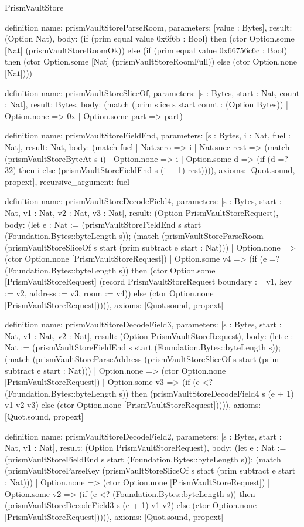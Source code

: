 \begin{lexlean}{PrismVaultStore}
\begin{semanticmodule}
definition{
  name: prismVaultStoreParseRoom,
  parameters: [value : Bytes],
  result: (Option Nat),
  body: (if (prim equal value 0x6f6b : Bool) then (ctor Option.some [Nat] (prismVaultStoreRoomOk)) else (if (prim equal value 0x66756c6c : Bool) then (ctor Option.some [Nat] (prismVaultStoreRoomFull)) else (ctor Option.none [Nat])))
}

definition{
  name: prismVaultStoreSliceOf,
  parameters: [s : Bytes, start : Nat, count : Nat],
  result: Bytes,
  body: (match (prim slice s start count : (Option Bytes))
    | Option.none => 0x
    | Option.some part => part)
}

definition{
  name: prismVaultStoreFieldEnd,
  parameters: [s : Bytes, i : Nat, fuel : Nat],
  result: Nat,
  body: (match fuel
    | Nat.zero => i
    | Nat.succ rest => (match (prismVaultStoreByteAt s i)
      | Option.none => i
      | Option.some d => (if (d =? 32) then i else (prismVaultStoreFieldEnd s (i + 1) rest)))),
  axioms: [Quot.sound, propext],
  recursive_argument: fuel
}

definition{
  name: prismVaultStoreDecodeField4,
  parameters: [s : Bytes, start : Nat, v1 : Nat, v2 : Nat, v3 : Nat],
  result: (Option PrismVaultStoreRequest),
  body: (let e : Nat := (prismVaultStoreFieldEnd s start (Foundation.Bytes::byteLength s)); (match (prismVaultStoreParseRoom (prismVaultStoreSliceOf s start (prim subtract e start : Nat)))
    | Option.none => (ctor Option.none [PrismVaultStoreRequest])
    | Option.some v4 => (if (e =? (Foundation.Bytes::byteLength s)) then (ctor Option.some [PrismVaultStoreRequest] (record PrismVaultStoreRequest {boundary := v1, key := v2, address := v3, room := v4})) else (ctor Option.none [PrismVaultStoreRequest])))),
  axioms: [Quot.sound, propext]
}

definition{
  name: prismVaultStoreDecodeField3,
  parameters: [s : Bytes, start : Nat, v1 : Nat, v2 : Nat],
  result: (Option PrismVaultStoreRequest),
  body: (let e : Nat := (prismVaultStoreFieldEnd s start (Foundation.Bytes::byteLength s)); (match (prismVaultStoreParseAddress (prismVaultStoreSliceOf s start (prim subtract e start : Nat)))
    | Option.none => (ctor Option.none [PrismVaultStoreRequest])
    | Option.some v3 => (if (e <? (Foundation.Bytes::byteLength s)) then (prismVaultStoreDecodeField4 s (e + 1) v1 v2 v3) else (ctor Option.none [PrismVaultStoreRequest])))),
  axioms: [Quot.sound, propext]
}

definition{
  name: prismVaultStoreDecodeField2,
  parameters: [s : Bytes, start : Nat, v1 : Nat],
  result: (Option PrismVaultStoreRequest),
  body: (let e : Nat := (prismVaultStoreFieldEnd s start (Foundation.Bytes::byteLength s)); (match (prismVaultStoreParseKey (prismVaultStoreSliceOf s start (prim subtract e start : Nat)))
    | Option.none => (ctor Option.none [PrismVaultStoreRequest])
    | Option.some v2 => (if (e <? (Foundation.Bytes::byteLength s)) then (prismVaultStoreDecodeField3 s (e + 1) v1 v2) else (ctor Option.none [PrismVaultStoreRequest])))),
  axioms: [Quot.sound, propext]
}


\end{semanticmodule}
\end{lexlean}
